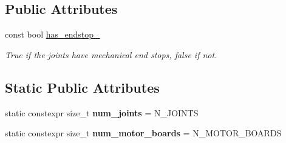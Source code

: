 \subsection*{Public Attributes}
\begin{DoxyCompactItemize}
\item 
const bool \hyperlink{classblmc__robots_1_1NJointBlmcRobotDriver_a584b85a9e8356e4afcdf1559edd700cc}{has\+\_\+endstop\+\_\+}
\begin{DoxyCompactList}\small\item\em True if the joints have mechanical end stops, false if not. \end{DoxyCompactList}\end{DoxyCompactItemize}
\subsection*{Static Public Attributes}
\begin{DoxyCompactItemize}
\item 
\mbox{\label{classblmc__robots_1_1NJointBlmcRobotDriver_a933b81d922085d51a8138cbb648c3e64}} 
static constexpr size\+\_\+t {\bfseries num\+\_\+joints} = N\+\_\+\+J\+O\+I\+N\+TS
\item 
\mbox{\label{classblmc__robots_1_1NJointBlmcRobotDriver_ad4897dda6376b6fabdf4b5ecd43c6c4c}} 
static constexpr size\+\_\+t {\bfseries num\+\_\+motor\+\_\+boards} = N\+\_\+\+M\+O\+T\+O\+R\+\_\+\+B\+O\+A\+R\+DS
\end{DoxyCompactItemize}
